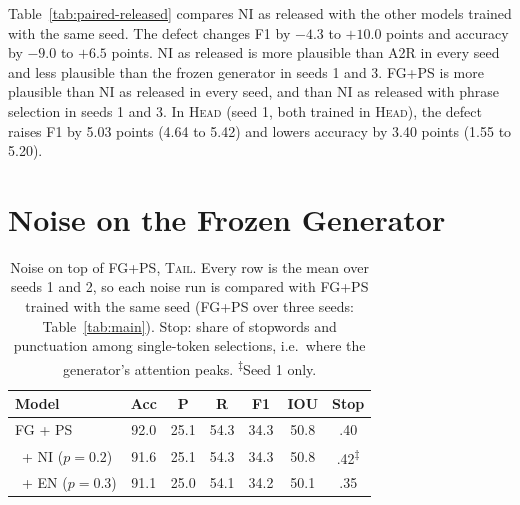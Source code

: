 \documentclass[11pt]{article}
\newcommand{\HEAD}{\textup{\textsc{Head}}}
\newcommand{\TAIL}{\textup{\textsc{Tail}}}
\begin{document}
Table~\ref{tab:paired-released} compares NI as released with the other models trained with the same seed. The defect changes F1 by $-4.3$ to $+10.0$ points and accuracy by $-9.0$ to $+6.5$ points. NI as released is more plausible than A2R in every seed and less plausible than the frozen generator in seeds 1 and 3. FG+PS is more plausible than NI as released in every seed, and than NI as released with phrase selection in seeds 1 and 3. In \HEAD{} (seed 1, both trained in \HEAD), the defect raises F1 by 5.03 points (4.64 to 5.42) and lowers accuracy by 3.40 points (1.55 to 5.20).

\section{Noise on the Frozen Generator}
\label{app:noise}

\begin{table}[h]
\centering
\small
\setlength{\tabcolsep}{3.5pt}
\begin{tabular}{@{}lcccccc@{}}
\toprule
Model & Acc & P & R & F1 & IOU & Stop \\
\midrule
FG + PS & 92.0 & 25.1 & 54.3 & 34.3 & 50.8 & .40 \\
\ + NI ($p = 0.2$) & 91.6 & 25.1 & 54.3 & 34.3 & 50.8 & .42\textsuperscript{$\ddagger$} \\
\ + EN ($p = 0.3$) & 91.1 & 25.0 & 54.1 & 34.2 & 50.1 & .35 \\
\bottomrule
\end{tabular}
\caption{Noise on top of FG+PS, \TAIL. Every row is the mean over seeds 1 and 2, so each noise run is compared with FG+PS trained with the same seed (FG+PS over three seeds: Table~\ref{tab:main}). Stop: share of stopwords and punctuation among single-token selections, i.e.\ where the generator's attention peaks. \textsuperscript{$\ddagger$}Seed 1 only.}
\label{tab:noise}
\end{table}
\end{document}
